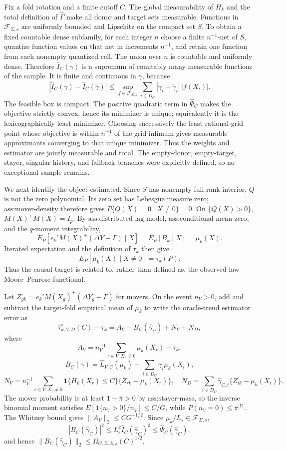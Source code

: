 Fix a fold rotation and a finite cutoff \(C\). The global measurability of \(H_k\) and the total definition of \(\widehat\Gamma\) make all donor and target sets measurable. Functions in \(\mathcal F_{\Sigma,s}\) are uniformly bounded and Lipschitz on the compact set \(S\). To obtain a fixed countable dense subfamily, for each integer \(n\) choose a finite \(n^{-1}\)-net of \(S\), quantize function values on that net in increments \(n^{-1}\), and retain one function from each nonempty quantized cell. The union over \(n\) is countable and uniformly dense. Therefore \(\widehat I_C(\gamma)\) is a supremum of countably many measurable functions of the sample. It is finite and continuous in \(\gamma\), because
\[
|\widehat I_C(\gamma)-\widehat I_C(\widetilde\gamma)|
\le \sup_{f\in\mathcal F_{\Sigma,s}}\sum_{i\in D_C}|\gamma_i-\widetilde\gamma_i|\,|f(X_i)|.
\]
The feasible box is compact. The positive quadratic term in \(\widehat\Psi_C\) makes the objective strictly convex, hence its minimizer is unique; equivalently it is the lexicographically least minimizer. Choosing successively the least rational-grid point whose objective is within \(n^{-1}\) of the grid infimum gives measurable approximants converging to that unique minimizer. Thus the weights and estimator are jointly measurable and total. The empty-donor, empty-target, stayer, singular-history, and fallback branches were explicitly defined, so no exceptional sample remains.

We next identify the object estimated. Since \(S\) has nonempty full-rank interior, \(Q\) is not the zero polynomial. Its zero set has Lebesgue measure zero; \(\text{ass:mover-density}\) therefore gives \(P\{Q(X)=0\mid X\ne0\}=0\). On \(\{Q(X)>0\}\), \(M(X)^+M(X)=I_p\). By \(\text{ass:distributed-lag-model}\), \(\text{ass:conditional-mean-zero}\), and the \(q\)-moment integrability,
\[
E_P[e_k'M(X)^+(\Delta Y-\Gamma)\mid X]
=E_P[B_k\mid X]=\mu_k(X).
\]
Iterated expectation and the definition of \(\tau_k\) then give
\[
E_P[\mu_k(X)\mid X\ne0]=\tau_k(P).
\]
Thus the causal target is related to, rather than defined as, the observed-law Moore--Penrose functional.

Let \(Z_{gk}^{\circ}=e_k'M(X_g)^+(\Delta Y_g-\Gamma)\) for movers. On the event \(n_V>0\), add and subtract the target-fold empirical mean of \(\mu_k\) to write the oracle-trend estimator error as
\[
\widehat\tau_{k,V,D}^{\circ}(C)-\tau_k
=A_V-B_C(\widehat\gamma_C)+N_V+N_D,
\]
where
\[
A_V=n_V^{-1}\sum_{r\in V:X_r\ne0}\mu_k(X_r)-\tau_k,
\]
\[
B_C(\gamma)=\widehat L_{V,C}(\mu_k)-\sum_{i\in D_C}\gamma_i\mu_k(X_i),
\]
\[
N_V=n_V^{-1}\sum_{r\in V:X_r\ne0}\mathbf 1\{H_k(X_r)\le C\}\{Z_{rk}^{\circ}-\mu_k(X_r)\},
\quad
N_D=\sum_{i\in D_C}\widehat\gamma_{C,i}\{Z_{ik}^{\circ}-\mu_k(X_i)\}.
\]
The mover probability is at least \(1-\overline\pi>0\) by \(\text{ass:stayer-mass}\), so the inverse binomial moment satisfies \(E[\mathbf 1\{n_V>0\}/n_V]\le C/G\), while \(P(n_V=0)\le\overline\pi^{|V|}\). The Whitney bound gives \(\|A_V\|_2\le C G^{-1/2}\). Since \(\mu_k/L_s\in\mathcal F_{\Sigma,s}\),
\[
|B_C(\widehat\gamma_C)|^2
\le L_s^2\widehat I_C(\widehat\gamma_C)^2
\le\widehat\Psi_C(\widehat\gamma_C),
\]
and hence \(\|B_C(\widehat\gamma_C)\|_2\le\Omega_{G,\Sigma,k,s}(C)^{1/2}\).

